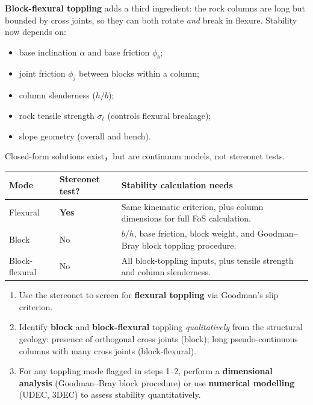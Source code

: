 \documentclass[a4paper,12pt]{article}
\begin{document}
\textbf{Block-flexural toppling} adds a third ingredient: the rock columns are long but bounded by cross joints, so they can both rotate \emph{and} break in flexure. Stability now depends on:
\begin{itemize}[nosep]
    \item base inclination $\alpha$ and base friction $\phi_b$;
    \item joint friction $\phi_j$ between blocks within a column;
    \item column slenderness ($h/b$);
    \item rock tensile strength $\sigma_t$ (controls flexural breakage);
    \item slope geometry (overall and bench).
\end{itemize}
Closed-form solutions exist，but are continuum models, not stereonet tests.

\begin{warnbox}
\small
\setlength{\tabcolsep}{4pt}
\renewcommand{\arraystretch}{1.15}

\begin{tabularx}{\linewidth}{@{}>{\raggedright\arraybackslash}p{2.6cm}
                                >{\centering\arraybackslash}p{1.8cm}
                                >{\raggedright\arraybackslash}X@{}}
\toprule
\textbf{Mode} & \textbf{Stereonet test?} & \textbf{Stability calculation needs} \\
\midrule
Flexural 
& \textbf{Yes} 
& Same kinematic criterion, plus column dimensions for full FoS calculation. \\

Block 
& No 
& $b/h$, base friction, block weight, and Goodman--Bray block toppling procedure. \\

Block-flexural 
& No 
& All block-toppling inputs, plus tensile strength and column slenderness. \\
\bottomrule
\end{tabularx}

\end{warnbox}

\begin{notebox}
\begin{enumerate}[nosep]
    \item Use the stereonet to screen for \textbf{flexural toppling} via Goodman's slip criterion.
    \item Identify \textbf{block} and \textbf{block-flexural} toppling \emph{qualitatively} from the structural geology: presence of orthogonal cross joints (block); long pseudo-continuous columns with many cross joints (block-flexural).
    \item For any toppling mode flagged in steps 1--2, perform a \textbf{dimensional analysis} (Goodman--Bray block procedure) or use \textbf{numerical modelling} (UDEC, 3DEC) to assess stability quantitatively.
\end{enumerate}
\end{notebox}
\end{document}
